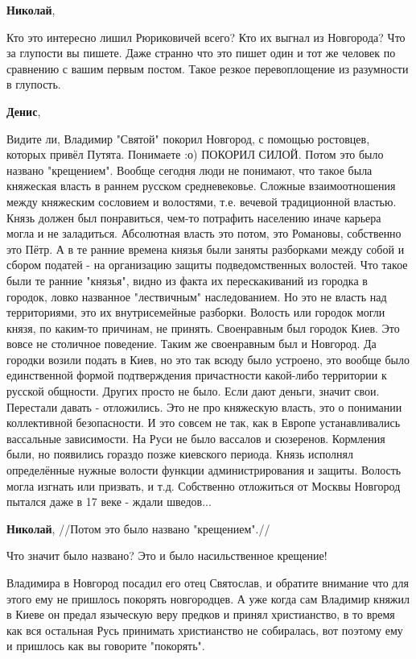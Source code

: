 \begin{itemize}
\begin{itemize}
\textbf{Николай}, 

Кто это интересно лишил Рюриковичей всего? Кто их выгнал из Новгорода? Что за
глупости вы пишете. Даже странно что это пишет один и тот же человек по
сравнению с вашим первым постом. Такое резкое перевоплощение из разумности в
глупость.

\textbf{Денис}, 

Видите ли, Владимир "Святой" покорил Новгород, с помощью ростовцев, которых
привёл Путята. Понимаете :о) ПОКОРИЛ СИЛОЙ. Потом это было названо "крещением".
Вообще сегодня люди не понимают, что такое была княжеская власть в раннем
русском средневековье. Сложные взаимоотношения между княжеским сословием и
волостями, т.е. вечевой традиционной властью. Князь должен был понравиться,
чем-то потрафить населению иначе карьера могла и не заладиться. Абсолютная
власть это потом, это Романовы, собственно это Пётр. А в те ранние времена
князья были заняты разборками между собой и сбором податей - на организацию
защиты подведомственных волостей. Что такое были те ранние "князья", видно из
факта их перескакиваний из городка в городок, ловко названное "лествичным"
наследованием. Но это не власть над территориями, это их внутрисемейные
разборки. Волость или городок могли князя, по каким-то причинам, не принять.
Своенравным был городок Киев. Это вовсе не столичное поведение. Таким же
своенравным был и Новгород. Да городки возили подать в Киев, но это так всюду
было устроено, это вообще было единственной формой подтверждения причастности
какой-либо территории к русской общности. Других просто не было. Если дают
деньги, значит свои. Перестали давать - отложились. Это не про княжескую
власть, это о понимании коллективной безопасности. И это совсем не так, как в
Европе устанавливались вассальные зависимости. На Руси не было вассалов и
сюзеренов. Кормления были, но появились гораздо позже киевского периода. Князь
исполнял определённые нужные волости функции администрирования и защиты.
Волость могла изгнать или призвать, и т.д. Собственно отложиться от Москвы
Новгород пытался даже в 17 веке - ждали шведов...

\textbf{Николай}, //Потом это было названо "крещением".//

Что значит было названо? Это и было насильственное крещение!

Владимира в Новгород посадил его отец Святослав, и обратите внимание что для
этого ему не пришлось покорять новгородцев. А уже когда сам Владимир княжил в
Киеве он предал языческую веру предков и принял христианство, в то время как
вся остальная Русь принимать христианство не собиралась, вот поэтому ему и
пришлось как вы говорите "покорять".


\end{itemize}
\end{itemize}
